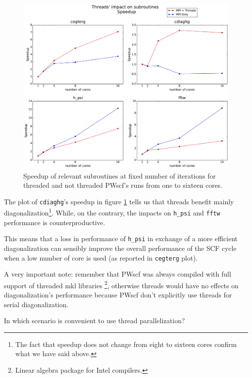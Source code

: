 \documentclass[a4paper,12pt]{article}
\begin{document}
\begin{figure}[hhh!]
\centerline{ \includegraphics[width=\linewidth]{threads_subroutines.pdf}	}
	\caption{Speedup of relevant subroutines at fixed number of iterations for threaded and not threaded PWscf's runs from one to sixteen cores.}
	\label{fig:threadsSubroutines}

\end{figure}


The plot of \texttt{cdiaghg}'s speedup in figure \ref{fig:threadsSubroutines} tells us that threads benefit mainly diagonalization\footnote{The fact that speedup does not change from eight to sixteen cores confirm what we have said above.}.
While, on the contrary, the impacts on \texttt{h\_psi} and \texttt{fftw} performance is counterproductive.

This means that a loss in performance of \texttt{h\_psi} in exchange of a more efficient diagonalization can sensibly improve the overall performance of the SCF cycle when a low number of core is used (as reported in \texttt{cegterg} plot).

A very important note: remember that PWscf was always compiled with full support of threaded mkl libraries \footnote{Linear algebra package for Intel compilers.}, otherwise threads would have no effects on diagonalization's performance because PWscf don't explicitly use threads for serial diagonalization.


\begin{center}
\begin{framed}
In which scenario is convenient to use thread parallelization?
\end{framed}
\end{center}
\end{document}
